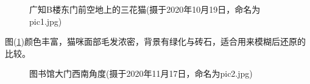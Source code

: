 \documentclass[UTF8]{ctexart}
\begin{document}
\begin{figure}[htbp]
\begin{center}
{            }
        \end{center}
        \caption{广知B楼东门前空地上的三花猫(摄于2020年10月19日，命名为{\ttfamily pic1.jpg})}
        \label{cat}
    \end{figure}

    图(\ref{cat})颜色丰富，猫咪面部毛发浓密，背景有绿化与砖石，适合用来模糊后还原的比较。
    \begin{figure}[htbp]
        \begin{center}
        \end{center}
        \caption{图书馆大门西南角度(摄于2020年11月17日，命名为{\ttfamily pic2.jpg})}
        \label{library}
    \end{figure}
\end{document}
